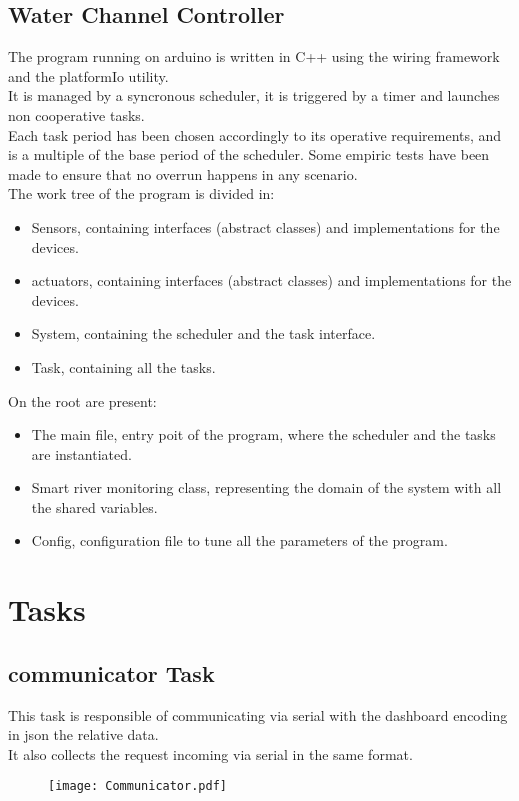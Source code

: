 \subsection{Water Channel Controller}
The program running on arduino is written in C++ using the wiring framework and the platformIo utility.\\
It is managed by a syncronous scheduler, it is triggered by a timer and launches non cooperative tasks.\\
Each task period has been chosen accordingly to its operative requirements, and is a multiple of the base period of the scheduler.
Some empiric tests have been made to ensure that no overrun happens in any scenario.\\
The work tree of the program is divided in:
\begin{itemize}
    \item Sensors, containing interfaces (abstract classes) and implementations for the devices.
    \item actuators, containing interfaces (abstract classes) and implementations for the devices.
    \item System, containing the scheduler and the task interface.
    \item Task, containing all the tasks.
\end{itemize}
On the root are present:
\begin{itemize}
    \item The main file, entry poit of the program, where the scheduler and the tasks are instantiated.
    \item Smart river monitoring class, representing the domain of the system with all the shared variables.
    \item Config, configuration file to tune all the parameters of the program.
\end{itemize}
\pagebreak

\section{Tasks}
\subsection{communicator Task}
This task is responsible of communicating via serial with the dashboard encoding in json the relative data.\\
It also collects the request incoming via serial in the same format.
\begin{figure}[H]
    \centering
\texttt{[image: Communicator.pdf]}
\end{figure}
\pagebreak
